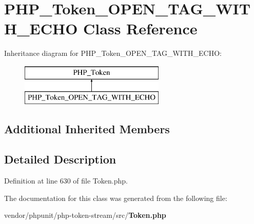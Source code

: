 \section{P\+H\+P\+\_\+\+Token\+\_\+\+O\+P\+E\+N\+\_\+\+T\+A\+G\+\_\+\+W\+I\+T\+H\+\_\+\+E\+C\+H\+O Class Reference}
\label{class_p_h_p___token___o_p_e_n___t_a_g___w_i_t_h___e_c_h_o}
Inheritance diagram for P\+H\+P\+\_\+\+Token\+\_\+\+O\+P\+E\+N\+\_\+\+T\+A\+G\+\_\+\+W\+I\+T\+H\+\_\+\+E\+C\+H\+O\+:\begin{figure}[H]
\begin{center}
\leavevmode
\includegraphics[height=2.000000cm]{class_p_h_p___token___o_p_e_n___t_a_g___w_i_t_h___e_c_h_o}
\end{center}
\end{figure}
\subsection*{Additional Inherited Members}


\subsection{Detailed Description}


Definition at line 630 of file Token.\+php.



The documentation for this class was generated from the following file\+:\begin{DoxyCompactItemize}
\item 
vendor/phpunit/php-\/token-\/stream/src/{\bf Token.\+php}\end{DoxyCompactItemize}

